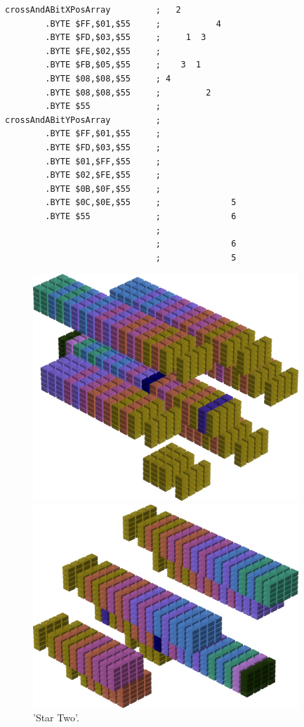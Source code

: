 \begin{lstlisting}
crossAndABitXPosArray         ;   2           
        .BYTE $FF,$01,$55     ;           4   
        .BYTE $FD,$03,$55     ;     1  3      
        .BYTE $FE,$02,$55     ;               
        .BYTE $FB,$05,$55     ;    3  1       
        .BYTE $08,$08,$55     ; 4             
        .BYTE $08,$08,$55     ;         2     
        .BYTE $55             ;               
crossAndABitYPosArray         ;               
        .BYTE $FF,$01,$55     ;               
        .BYTE $FD,$03,$55     ;               
        .BYTE $01,$FF,$55     ;               
        .BYTE $02,$FE,$55     ;               
        .BYTE $0B,$0F,$55     ;               
        .BYTE $0C,$0E,$55     ;              5
        .BYTE $55             ;              6
                              ;               
                              ;              6
                              ;              5
\end{lstlisting}


\begin{figure}[H]
    \centering
    \begin{adjustbox}{width=10cm,center}
      \includegraphics[width=10cm]{src/colorspace_patterns/pattern7-45.png}%
    \end{adjustbox}
    \begin{adjustbox}{width=10cm}
      \includegraphics[width=10cm]{src/colorspace_patterns/pattern7-225.png}%
    \end{adjustbox}
\caption{'Star Two'.}
\end{figure}
\clearpage

